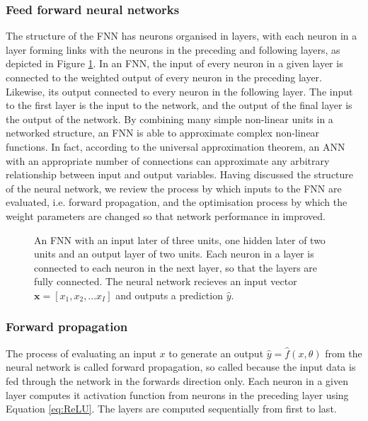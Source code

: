 \subsubsection{Feed forward neural networks}
\label{sec:fnn}
The structure of the FNN has neurons organised in layers, with each neuron in a layer forming links with the neurons in the preceding and following layers, as depicted in Figure \ref{fig:neural_network}. 
In an FNN, the input of every neuron in a given layer is connected to the weighted output of every neuron in the preceding layer. Likewise, its output connected to every neuron in the following layer. The input to the first layer is the input to the network, and the output of the final layer is the output of the network.
By combining many simple non-linear units in a networked structure, an FNN is able to approximate complex non-linear functions. In fact, according to the universal approximation theorem, an ANN with an appropriate number of connections can approximate any arbitrary relationship between input and output variables.
Having discussed the structure of the neural network, we review the process by which inputs to the FNN are evaluated, i.e. forward propagation, and the optimisation process by which the weight parameters are changed so that network performance in improved.

\begin{figure}[htb!]
    \centering
    
    \caption[A neural feed forward network]{An FNN with an input later of three units, one hidden later of two units and an output layer of two units. Each neuron in a layer is connected to each neuron in the next layer, so that the layers are fully connected.
    The neural network recieves an input vector $\mathbf{x}=[x_1, x_2, ... x_I]$ and outputs a prediction $\hat{y}$.}
    \label{fig:neural_network}
\end{figure}

\subsubsection{Forward propagation}
The process of evaluating an input $x$ to generate an output $\hat{y} = \hat{f}(x,\theta)$ from the neural network is called forward propagation, 
so called because the input data is fed through the network in the forwards direction only. 
Each neuron in a given layer computes it activation function from neurons in the preceding layer using Equation \ref{eq:ReLU}.
The layers are computed sequentially from first to last. 

